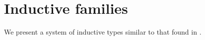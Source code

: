 \section{Inductive families}
We present a system of inductive types similar to that found in \cite{Dybjer1994}.
